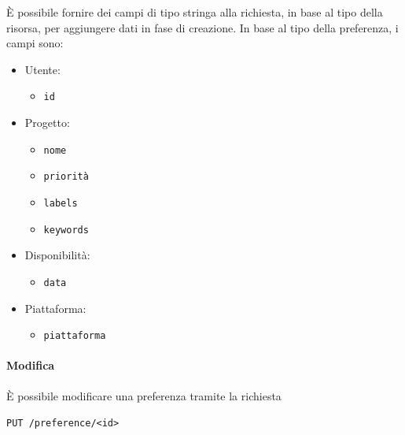 È possibile fornire dei campi di tipo stringa alla richiesta, in base al tipo della risorsa, per aggiungere dati in fase di creazione.
In base al tipo della preferenza, i campi sono:
\begin{itemize}[noitemsep]
    \item Utente:
        \begin{itemize}[noitemsep]
            \item \texttt{id}
        \end{itemize}
    \item Progetto:
        \begin{itemize}[noitemsep]
            \item \texttt{nome}
            \item \texttt{priorità}
            \item \texttt{labels}
            \item \texttt{keywords}
        \end{itemize}
    \item Disponibilità:
        \begin{itemize}[noitemsep]
            \item \texttt{data}
        \end{itemize}
    \item Piattaforma:
        \begin{itemize}[noitemsep]
            \item \texttt{piattaforma}
        \end{itemize}
\end{itemize}


\paragraph{Modifica}

È possibile modificare una preferenza tramite la richiesta
\begin{center}
    \texttt{PUT /preference/<id>}
\end{center}


